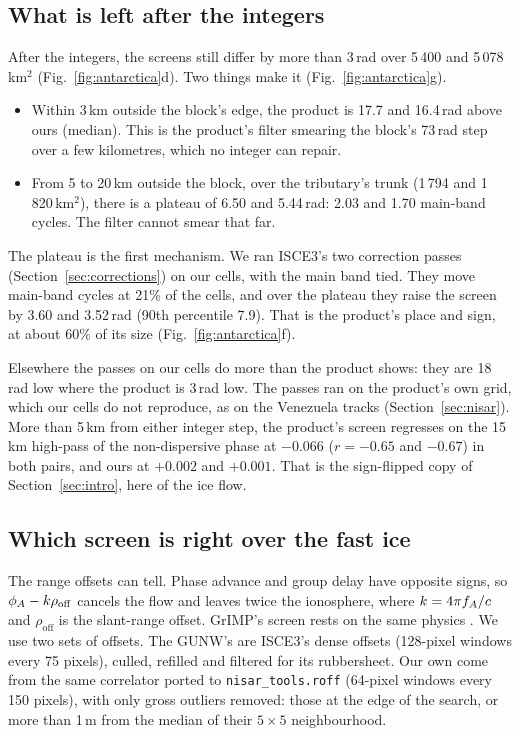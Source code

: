 \subsection{What is left after the integers}
After the integers, the screens still differ by more than 3\,rad over 5\,400 and 5\,078\,km$^2$
(Fig.~\ref{fig:antarctica}d). Two things make it (Fig.~\ref{fig:antarctica}g).
\begin{itemize}
  \item Within 3\,km outside the block's edge, the product is 17.7 and 16.4\,rad above ours (median). This is the
        product's filter smearing the block's 73\,rad step over a few kilometres, which no integer can repair.
  \item From 5 to 20\,km outside the block, over the tributary's trunk (1\,794 and 1\,820\,km$^2$), there is a plateau of
        6.50 and 5.44\,rad: 2.03 and 1.70 main-band cycles. The filter cannot smear that far.
\end{itemize}
The plateau is the first mechanism. We ran ISCE3's two correction passes (Section~\ref{sec:corrections}) on our cells,
with the main band tied. They move main-band cycles at 21\% of the cells, and over the plateau they raise the screen by
3.60 and 3.52\,rad (90th percentile 7.9). That is the product's place and sign, at about 60\% of its size
(Fig.~\ref{fig:antarctica}f).

Elsewhere the passes on our cells do more than the product shows: they are 18\,rad low where the product is 3\,rad low.
The passes ran on the product's own grid, which our cells do not reproduce, as on the Venezuela tracks
(Section~\ref{sec:nisar}). More than 5\,km from either integer step, the product's screen regresses on the 15\,km
high-pass of the non-dispersive phase at $-0.066$ ($r = -0.65$ and $-0.67$) in both pairs, and ours at $+0.002$ and
$+0.001$. That is the sign-flipped copy of Section~\ref{sec:intro}, here of the ice flow.

\subsection{Which screen is right over the fast ice}
The range offsets can tell. Phase advance and group delay have opposite signs, so $\phi_A - k\rho_\mathrm{off}$ cancels
the flow and leaves twice the ionosphere, where $k = 4\pi f_A/c$ and $\rho_\mathrm{off}$ is the slant-range offset.
GrIMP's screen rests on the same physics \citep{joughin2026nisarerrors}. We use two sets of offsets. The GUNW's are
ISCE3's dense offsets (128-pixel windows every 75 pixels), culled, refilled and filtered for its rubbersheet. Our own come
from the same correlator ported to \texttt{nisar\_tools.roff} (64-pixel windows every 150 pixels), with only gross
outliers removed: those at the edge of the search, or more than 1\,m from the median of their $5\times5$
neighbourhood.

